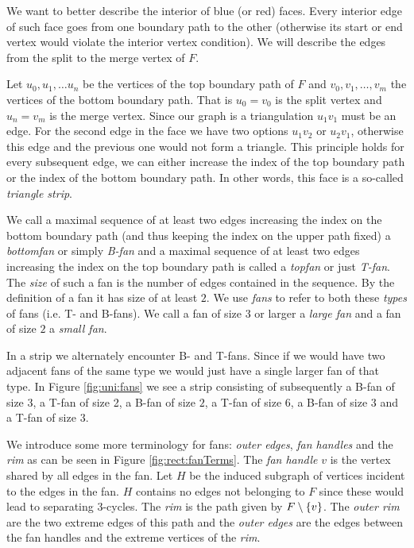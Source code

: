    We want to better describe the interior of blue (or red) faces. Every interior edge of such face goes from one boundary path to the other (otherwise its start or end vertex would violate the interior vertex condition). We will describe the edges from the split to the merge vertex of $F$.

    Let $u_0 , u_1, \ldots u_n$ be the vertices of the top boundary path of $F$ and $v_0, v_1, \ldots, v_m$ the vertices of the bottom boundary path. That is $u_0=v_0$ is the split vertex and $u_n = v_m$ is the merge vertex. Since our graph is a triangulation $u_1v_1$ must be an edge. For the second edge in the face we have two options $u_1v_2$ or $u_2v_1$, otherwise this edge and the previous one would not form a triangle. This principle holds for every subsequent edge, we can either increase the index of the top boundary path or the index of the bottom boundary path. In other words, this face is a so-called \emph{triangle strip}.

    We call a maximal sequence of at least two edges increasing the index on the bottom boundary path (and thus keeping the index on the upper path fixed) a \emph{bottomfan} or simply \emph{B-fan} and a maximal sequence of at least two edges increasing the index on the top boundary path is called a \emph{topfan} or just \emph{T-fan}.
    The \emph{size} of such a fan is the number of edges contained in the sequence. By the definition of a fan it has size of at least $2$.
    We use \emph{fans} to refer to both these \emph{types} of fans (i.e. T- and B-fans).
    We call a fan of size $3$ or larger a \emph{large fan} and a fan of size $2$ a \emph{small fan}.

    In a strip we alternately encounter B- and T-fans. Since if we would have two adjacent fans of the same type we would just have a single larger fan of that type.
    In Figure \ref{fig:uni:fans} we see a strip consisting of subsequently a B-fan of size $3$, a T-fan of size 2, a B-fan of size $2$, a T-fan of size $6$, a B-fan of size $3$ and a T-fan of size $3$.



     We introduce some more terminology for fans: \emph{outer edges}, \emph{fan handles} and the \emph{rim} as can be seen in Figure \ref{fig:rect:fanTerms}. The \emph{fan handle} $v$ is the vertex shared by all edges in the fan. Let $H$ be the induced subgraph of vertices incident to the edges in the fan. $H$ contains no edges not belonging to $F$ since these would lead to separating 3-cycles. The \emph{rim} is the path given by $F\setminus \left\lbrace {v} \right\rbrace$.
     The \emph{outer rim} are the two extreme edges of this path and the \emph{outer edges} are the edges between the fan handles and the extreme vertices of the \emph{rim}.

